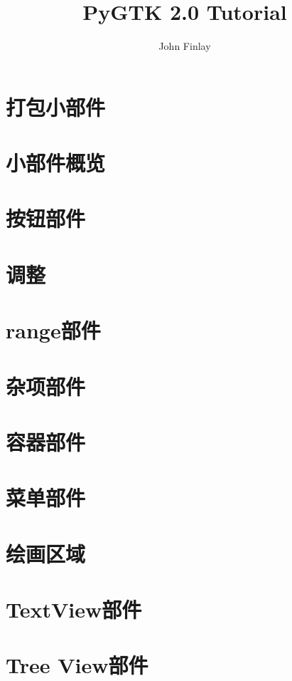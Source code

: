 \documentclass[a4paper,12pt]{book}%
\title{PyGTK 2.0 Tutorial}
\author{John Finlay}
\begin{document}
	\begin{figure}[!hp]
		\centering
	\end{figure}
	\maketitle
	\frontmatter
	\mainmatter
	\tableofcontents
	
	
	
	\chapter{打包小部件}
	\chapter{小部件概览}
	\chapter{按钮部件}
	\chapter{调整}
	\chapter{range部件}
	\chapter{杂项部件}
	\chapter{容器部件}
	\chapter{菜单部件}
	\chapter{绘画区域}
	\chapter{TextView部件}
	\chapter{Tree View部件}
\end{document}
